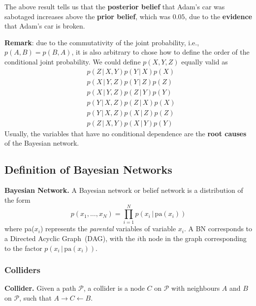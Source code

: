 \documentclass{article}
\begin{document}
\noindent The above result tells us that the \textbf{posterior belief} that Adam's car was sabotaged increases above the \textbf{prior belief}, which was $0.05$, due to the \textbf{evidence} that Adam's car is broken.

\textbf{Remark}: due to the commutativity of the joint probability, i.e., $p(A, B) = p(B, A)$, it is also arbitrary to chose how to define the order of the conditional joint probability. We could define $p(X, Y, Z)$ equally valid as
\begin{align*}
    &p(Z \,|\, X, Y) p(Y \,|\, X) p(X) \\
    &p(X \,|\, Y, Z) p(Y \,|\, Z) p(Z) \\
    &p(X \,|\, Y, Z) p(Z \,|\, Y) p(Y) \\
    &p(Y \,|\, X, Z) p(Z \,|\, X) p(X) \\
    &p(Y \,|\, X, Z) p(X \,|\, Z) p(Z) \\
    &p(Z \,|\, X, Y) p(X \,|\, Y) p(Y)
\end{align*}
Usually, the variables that have no conditional dependence are the \textbf{root causes} of the Bayesian network.

\subsection{Definition of Bayesian Networks}
\begin{theorem}
    \textbf{Bayesian Network.} A Bayesian network or belief network is a distribution of the form
    $$
        p(x_1, \dots, x_N) = \prod_{i=1}^N p(x_i \,|\, \text{pa}(x_i))
    $$
    where pa($x_i$) represents the \textit{parental} variables of variable $x_i$. A BN corresponds to a Directed Acyclic Graph~(DAG), with the $i$th node in the graph corresponding to the factor $p(x_i\,|\,\text{pa}(x_i))$.
\end{theorem}


\subsubsection{Colliders}
\begin{theorem}
    \textbf{Collider.} Given a path $\mathcal{P}$, a collider is a node $C$ on $\mathcal{P}$ with neighbours $A$ and $B$ on $\mathcal{P}$, such that $A \rightarrow C \leftarrow B$.
    \begin{center}
    \end{center}
\end{theorem}
\end{document}
